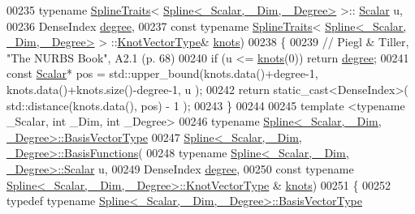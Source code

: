 \begin{DoxyCode}
00235     \textcolor{keyword}{typename} \hyperlink{struct_eigen_1_1_spline_traits}{SplineTraits}< \hyperlink{group___splines___module_class_eigen_1_1_spline}{Spline<\_Scalar, \_Dim, \_Degree>} >::
      \hyperlink{group___splines___module_a8cafd78b564825c76fbb3419653d9742}{Scalar} u,
00236     DenseIndex \hyperlink{group___splines___module_a0df23e941ac0f31dcd095a4dd4f4a7ec}{degree},
00237     \textcolor{keyword}{const} \textcolor{keyword}{typename} \hyperlink{struct_eigen_1_1_spline_traits}{SplineTraits}< \hyperlink{group___splines___module_class_eigen_1_1_spline}{Spline<\_Scalar, \_Dim, \_Degree>} >
      ::\hyperlink{group___splines___module_a066f7a8b120316c9068b559f0790e9ec}{KnotVectorType}& \hyperlink{group___splines___module_ae3eac8af580ad880d8ad3a259d453aa1}{knots})
00238   \{
00239     \textcolor{comment}{// Piegl & Tiller, "The NURBS Book", A2.1 (p. 68)}
00240     \textcolor{keywordflow}{if} (u <= \hyperlink{group___splines___module_ae3eac8af580ad880d8ad3a259d453aa1}{knots}(0)) \textcolor{keywordflow}{return} \hyperlink{group___splines___module_a0df23e941ac0f31dcd095a4dd4f4a7ec}{degree};
00241     \textcolor{keyword}{const} \hyperlink{group___splines___module_a8cafd78b564825c76fbb3419653d9742}{Scalar}* pos = std::upper\_bound(knots.data()+degree-1, knots.data()+knots.size()-degree-1, u
      );
00242     \textcolor{keywordflow}{return} \textcolor{keyword}{static\_cast<}DenseIndex\textcolor{keyword}{>}( std::distance(knots.data(), pos) - 1 );
00243   \}
00244 
00245   \textcolor{keyword}{template} <\textcolor{keyword}{typename} \_Scalar, \textcolor{keywordtype}{int} \_Dim, \textcolor{keywordtype}{int} \_Degree>
00246   \textcolor{keyword}{typename} \hyperlink{group___splines___module_a1d49cef942ea59d85d1711ee32354e6b}{Spline<\_Scalar, \_Dim, \_Degree>::BasisVectorType}
00247     \hyperlink{group___splines___module_a038506788499d71aedddc5211c33bb6e}{Spline<\_Scalar, \_Dim, \_Degree>::BasisFunctions}(
00248     \textcolor{keyword}{typename} \hyperlink{group___splines___module_a8cafd78b564825c76fbb3419653d9742}{Spline<\_Scalar, \_Dim, \_Degree>::Scalar} u,
00249     DenseIndex \hyperlink{group___splines___module_a0df23e941ac0f31dcd095a4dd4f4a7ec}{degree},
00250     \textcolor{keyword}{const} \textcolor{keyword}{typename} \hyperlink{group___splines___module_a066f7a8b120316c9068b559f0790e9ec}{Spline<\_Scalar, \_Dim, \_Degree>::KnotVectorType}
      & \hyperlink{group___splines___module_ae3eac8af580ad880d8ad3a259d453aa1}{knots})
00251   \{
00252     \textcolor{keyword}{typedef} \textcolor{keyword}{typename} \hyperlink{group___splines___module_a1d49cef942ea59d85d1711ee32354e6b}{Spline<\_Scalar, \_Dim, \_Degree>::BasisVectorType}

\end{DoxyCode}
